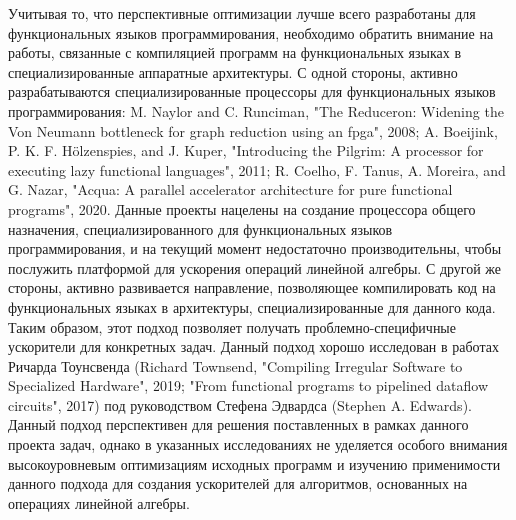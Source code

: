 \documentclass[12pt]{article}  %
\theoremstyle{remark}
\begin{document}
Учитывая то, что перспективные оптимизации лучше всего разработаны для функциональных языков программирования, необходимо обратить внимание на работы, связанные с компиляцией программ на функциональных языках в специализированные аппаратные архитектуры. С одной стороны, активно разрабатываются специализированные процессоры для функциональных языков программирования: M. Naylor and C. Runciman, "The Reduceron: Widening the Von Neumann bottleneck for graph reduction using an fpga", 2008; A. Boeijink, P. K. F. Hölzenspies, and J. Kuper, "Introducing the Pilgrim: A processor for executing lazy functional languages", 2011; R. Coelho, F. Tanus, A. Moreira, and G. Nazar, "Acqua: A parallel accelerator architecture for pure functional programs", 2020. Данные проекты нацелены на создание процессора общего назначения, специализированного для функциональных языков программирования, и на текущий момент недостаточно производительны, чтобы послужить платформой для ускорения операций линейной алгебры. С другой же стороны, активно развивается направление, позволяющее компилировать код на функциональных языках в архитектуры, специализированные для данного кода. Таким образом, этот подход позволяет получать проблемно-специфичные ускорители для конкретных задач. Данный подход хорошо исследован в работах Ричарда Тоунсвенда (Richard Townsend, "Compiling Irregular Software to Specialized Hardware", 2019; "From functional programs to pipelined dataflow circuits", 2017) под руководством Стефена Эдвардса (Stephen A. Edwards). Данный подход перспективен для решения поставленных в рамках данного проекта задач, однако в указанных исследованиях не уделяется особого внимания высокоуровневым оптимизациям исходных программ и изучению применимости данного подхода для создания ускорителей для алгоритмов, основанных на операциях линейной алгебры.
\end{document}
